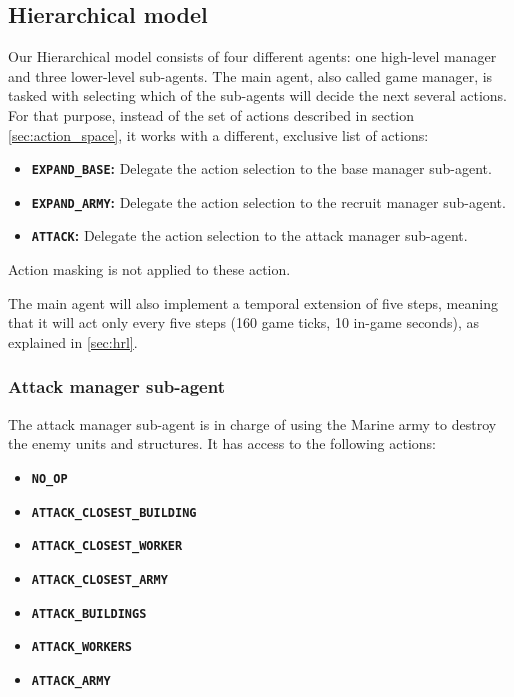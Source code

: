 \subsection{Hierarchical model}

Our Hierarchical model consists of four different agents: one high-level manager and three lower-level sub-agents. The main agent, also called game manager, is tasked with selecting which of the sub-agents will decide the next several actions. For that purpose, instead of the set of actions described in section \ref{sec:action_space}, it works with a different, exclusive list of actions:

\begin{itemize}
    \item \textbf{\texttt{EXPAND\_BASE}:} Delegate the action selection to the base manager sub-agent.
    \item \textbf{\texttt{EXPAND\_ARMY}:} Delegate the action selection to the recruit manager sub-agent.
    \item \textbf{\texttt{ATTACK}:} Delegate the action selection to the attack manager sub-agent.
\end{itemize}

Action masking is not applied to these action.

The main agent will also implement a temporal extension of five steps, meaning that it will act only every five steps (160 game ticks, 10 in-game seconds), as explained in \ref{sec:hrl}.

\subsubsection*{Attack manager sub-agent}

The attack manager sub-agent is in charge of using the Marine army to destroy the enemy units and structures. It has access to the following actions:

\begin{multicols}{2}
\begin{itemize}
    \item \textbf{\texttt{NO\_OP}}
    \item \textbf{\texttt{ATTACK\_CLOSEST\_BUILDING}}
    \item \textbf{\texttt{ATTACK\_CLOSEST\_WORKER}}
    \item \textbf{\texttt{ATTACK\_CLOSEST\_ARMY}}
    \item \textbf{\texttt{ATTACK\_BUILDINGS}}
    \item \textbf{\texttt{ATTACK\_WORKERS}}
    \item \textbf{\texttt{ATTACK\_ARMY}}
\end{itemize}
\end{multicols}

